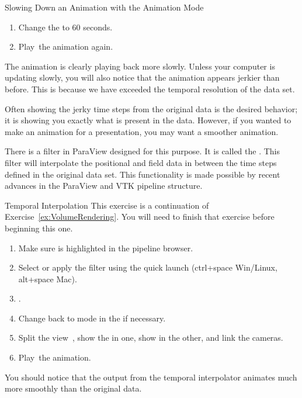 \begin{exercise}{Slowing Down an Animation with the Animation Mode}
  \begin{enumerate}
    \restorecounter
  \item Change the  to 60 seconds.
  \item Play~\vcrPlay the animation again.
  \end{enumerate}

  The animation is clearly playing back more slowly.  Unless your computer
  is updating slowly, you will also notice that the animation appears
  jerkier than before.  This is because we have exceeded the temporal
  resolution of the data set.
\end{exercise}

Often showing the jerky time steps from the original data is the desired
behavior; it is showing you exactly what is present in the data.  However,
if you wanted to make an animation for a presentation, you may want a
smoother animation.

There is a filter in ParaView designed for this purpose.  It is called
the .  This filter will interpolate the
positional and field data in between the time steps defined in the original
data set.  This functionality is made possible by recent advances in the
ParaView and VTK pipeline structure.

\begin{exercise}{Temporal Interpolation}
  \label{ex:TemporalInterpolation}%
  This exercise is a continuation of Exercise~\ref{ex:VolumeRendering}.
  You will need to finish that exercise before beginning this one.

  \begin{enumerate}
  \item Make sure  is highlighted in the pipeline browser.
  \item Select  \ra {} \ra {} or apply the  filter using the
    quick launch (ctrl+space Win/Linux, alt+space Mac).
  \item \apply.
  \item Change back to  mode in the  if necessary.
  \item Split the view~\splitViewH, show the  in
    one, show  in the other, and link the cameras.
  \item Play~\vcrPlay the animation.
  \end{enumerate}

  You should notice that the output from the temporal interpolator animates
  much more smoothly than the original data.
\end{exercise}

